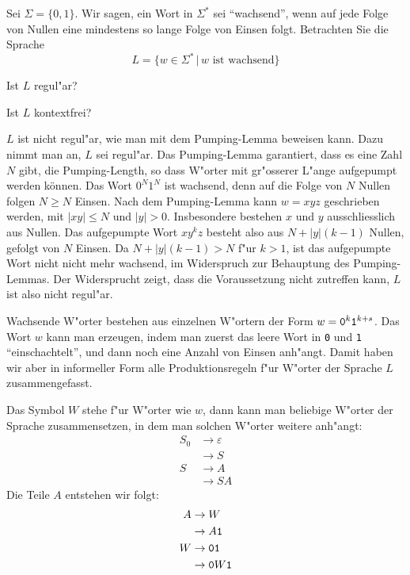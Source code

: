 Sei $\Sigma=\{0,1\}$.
Wir sagen, ein Wort in $\Sigma^*$ sei ``wachsend'',
wenn auf jede Folge von Nullen eine mindestens
so lange Folge von Einsen folgt.
Betrachten Sie die Sprache
\[
L=\{
w\in \Sigma^*\,|\, \text{$w$ ist wachsend}
\}
\]
\begin{teilaufgaben}
\item Ist $L$ regul"ar?
\item Ist $L$ kontextfrei?
\end{teilaufgaben}

\begin{loesung}
\begin{teilaufgaben}
\item
$L$ ist nicht regul"ar, wie man mit dem Pumping-Lemma beweisen kann.
Dazu nimmt man an, $L$ sei regul"ar. Das Pumping-Lemma garantiert, dass
es eine Zahl $N$ gibt, die Pumping-Length, so dass W"orter mit gr"osserer
L"ange aufgepumpt werden können. Das Wort $0^N1^N$ ist wachsend, denn
auf die Folge von $N$ Nullen folgen $N\ge N$ Einsen. Nach dem Pumping-Lemma
kann $w=xyz$ geschrieben werden, mit $|xy|\le N$ und $|y|>0$. Insbesondere bestehen
$x$ und $y$ ausschliesslich aus Nullen. Das aufgepumpte Wort
$xy^kz$ besteht also aus $N+|y|(k-1)$ Nullen, gefolgt von $N$ Einsen.
Da $N+|y|(k-1) > N$ f"ur $k>1$, ist das aufgepumpte Wort nicht nicht
mehr wachsend, im Widerspruch zur Behauptung des Pumping-Lemmas. Der
Widersprucht zeigt, dass die Voraussetzung nicht zutreffen kann, $L$
ist also nicht regul"ar.
\item
Wachsende W"orter bestehen aus einzelnen W"ortern der Form
$w={\tt 0}^k{\tt 1}^{k+s}$.  Das Wort $w$ kann man erzeugen,
indem man zuerst das leere Wort in {\tt 0} und {\tt 1}
``einschachtelt'', und dann noch eine Anzahl von Einsen anh"angt.
Damit haben wir aber in informeller Form alle Produktionsregeln
f"ur W"orter der Sprache $L$ zusammengefasst.

Das Symbol $W$ stehe f"ur W"orter wie $w$, dann kann man beliebige W"orter der
Sprache zusammensetzen, in dem man solchen W"orter weitere anh"angt:
\begin{align*}
S_0&\to \varepsilon\\
   &\to S\\
S&\to A\\
 &\to SA
\end{align*}
Die Teile $A$ entstehen wir folgt:
\begin{align*}
A&\to W\\
 &\to A{\tt 1}\\
W&\to {\tt01}\\
 &\to {\tt 0}W{\tt 1}\\
\end{align*}
\end{teilaufgaben}
\end{loesung}
